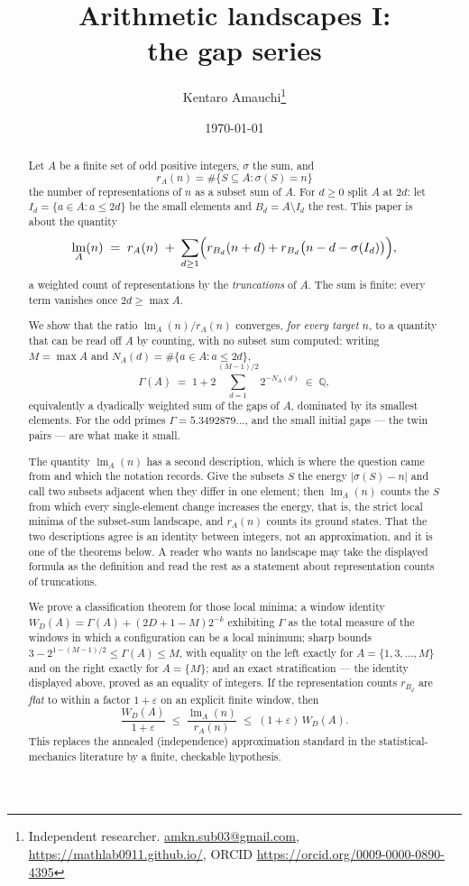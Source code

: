 \documentclass[11pt,a4paper]{article}
\title{Arithmetic landscapes I:\\
the gap series}
\author{Kentaro Amauchi\thanks{Independent researcher.
\href{mailto:amkn.sub03@gmail.com}{amkn.sub03@gmail.com},
\url{https://mathlab0911.github.io/}, ORCID \url{https://orcid.org/0009-0000-0890-4395}}}
\date{\today}
\theoremstyle{plain}
\theoremstyle{definition}
\theoremstyle{remark}
\DeclareMathOperator{\lm}{lm}
\begin{document}
\maketitle

\begin{abstract}
Let $A$ be a finite set of odd positive integers, $\sigma$ the sum, and
\[
  r_A(n)=\#\{S\subseteq A:\sigma(S)=n\}
\]
the number of representations of $n$ as a subset sum of $A$. For $d\ge0$ split
$A$ at $2d$: let $I_d=\{a\in A:a\le2d\}$ be the small elements and
$B_d=A\setminus I_d$ the rest. This paper is about the quantity
\[
  \lm_A(n)\;=\;r_A(n)\;+\;\sum_{d\ge1}
    \Bigl(r_{B_d}(n+d)+r_{B_d}\bigl(n-d-\sigma(I_d)\bigr)\Bigr),
\]
a weighted count of representations by the \emph{truncations} of $A$. The sum is
finite: every term vanishes once $2d\ge\max A$.

We show that the ratio $\lm_A(n)/r_A(n)$ converges, \emph{for every target $n$},
to a quantity that can be read off $A$ by counting, with no subset sum computed:
writing $M=\max A$ and $N_A(d)=\#\{a\in A:a\le2d\}$,
\[
  \Gamma(A)\;=\;1+2\sum_{d=1}^{(M-1)/2}2^{-N_A(d)}\;\in\;\mathbb{Q},
\]
equivalently a dyadically weighted sum of the gaps of $A$, dominated by its
smallest elements. For the odd primes $\Gamma=5.3492879\ldots$, and the small
initial gaps --- the twin pairs --- are what make it small.

The quantity $\lm_A(n)$ has a second description, which is where the question
came from and which the notation records. Give the subsets $S$ the energy
$|\sigma(S)-n|$ and call two subsets adjacent when they differ in one element;
then $\lm_A(n)$ counts the $S$ from which every single-element change increases
the energy, that is, the strict local minima of the subset-sum landscape, and
$r_A(n)$ counts its ground states. That the two descriptions agree is an
identity between integers, not an approximation, and it is one of the theorems
below. A reader who wants no landscape may take the displayed formula as the
definition and read the rest as a statement about representation counts of
truncations.

We prove a classification theorem for those local minima; a window
identity $W_D(A)=\Gamma(A)+(2D+1-M)2^{-k}$ exhibiting $\Gamma$ as the total
measure of the windows in which a configuration can be a local minimum; sharp
bounds $3-2^{1-(M-1)/2}\le\Gamma(A)\le M$, with equality on the left exactly for
$A=\{1,3,\dots,M\}$ and on the right exactly for $A=\{M\}$; and an exact
stratification --- the identity displayed above, proved as an equality of
integers. If the representation counts $r_{B_d}$ are \emph{flat} to within a
factor $1+\varepsilon$ on an explicit finite window, then
\[
\frac{W_D(A)}{1+\varepsilon}\;\le\;\frac{\lm_A(n)}{r_A(n)}\;\le\;(1+\varepsilon)\,W_D(A).
\]
This replaces the annealed (independence) approximation standard in the
statistical-mechanics literature by a finite, checkable hypothesis.


\end{abstract}
\end{document}
